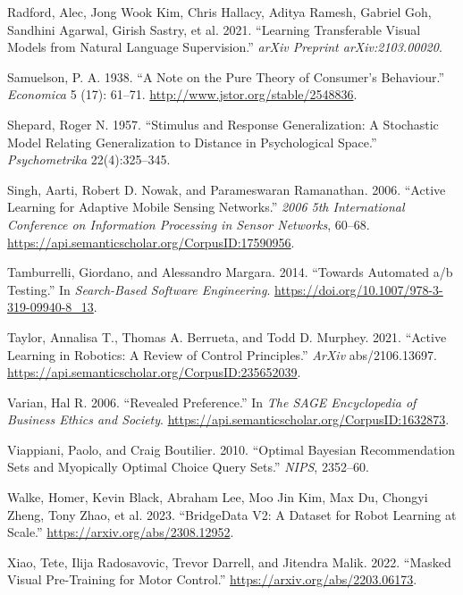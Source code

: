 \documentclass[
  letterpaper,
  numbers=noenddot,
  DIV=11]{scrreprt}
\newlength{\cslhangindent}
\newenvironment{CSLReferences}[2] %
 {\begin{list}{}{%
  \setlength{\itemindent}{0pt}
  \setlength{\leftmargin}{0pt}
  \setlength{\parsep}{0pt}
  \ifodd #1
   \setlength{\leftmargin}{\cslhangindent}
   \setlength{\itemindent}{-1\cslhangindent}
  \fi
  \setlength{\itemsep}{#2\baselineskip}}}
 {\end{list}}
\theoremstyle{definition}
\theoremstyle{plain}
\theoremstyle{plain}
\theoremstyle{remark}
\begin{document}
\begin{CSLReferences}{1}{0}
Radford, Alec, Jong Wook Kim, Chris Hallacy, Aditya Ramesh, Gabriel Goh,
Sandhini Agarwal, Girish Sastry, et al. 2021. {``Learning Transferable
Visual Models from Natural Language Supervision.''} \emph{arXiv Preprint
arXiv:2103.00020}.

Samuelson, P. A. 1938. {``A Note on the Pure Theory of Consumer's
Behaviour.''} \emph{Economica} 5 (17): 61--71.
\url{http://www.jstor.org/stable/2548836}.

Shepard, Roger N. 1957. {``Stimulus and Response Generalization: A
Stochastic Model Relating Generalization to Distance in Psychological
Space.''} \emph{Psychometrika} 22(4):325--345.

Singh, Aarti, Robert D. Nowak, and Parameswaran Ramanathan. 2006.
{``Active Learning for Adaptive Mobile Sensing Networks.''} \emph{2006
5th International Conference on Information Processing in Sensor
Networks}, 60--68.
\url{https://api.semanticscholar.org/CorpusID:17590956}.

Tamburrelli, Giordano, and Alessandro Margara. 2014. {``Towards
Automated a/b Testing.''} In \emph{Search-Based Software Engineering}.
\url{https://doi.org/10.1007/978-3-319-09940-8_13}.

Taylor, Annalisa T., Thomas A. Berrueta, and Todd D. Murphey. 2021.
{``Active Learning in Robotics: A Review of Control Principles.''}
\emph{ArXiv} abs/2106.13697.
\url{https://api.semanticscholar.org/CorpusID:235652039}.

Varian, Hal R. 2006. {``Revealed Preference.''} In \emph{The SAGE
Encyclopedia of Business Ethics and Society}.
\url{https://api.semanticscholar.org/CorpusID:1632873}.

Viappiani, Paolo, and Craig Boutilier. 2010. {``Optimal Bayesian
Recommendation Sets and Myopically Optimal Choice Query Sets.''}
\emph{NIPS}, 2352--60.

Walke, Homer, Kevin Black, Abraham Lee, Moo Jin Kim, Max Du, Chongyi
Zheng, Tony Zhao, et al. 2023. {``BridgeData V2: A Dataset for Robot
Learning at Scale.''} \url{https://arxiv.org/abs/2308.12952}.

Xiao, Tete, Ilija Radosavovic, Trevor Darrell, and Jitendra Malik. 2022.
{``Masked Visual Pre-Training for Motor Control.''}
\url{https://arxiv.org/abs/2203.06173}.


\end{CSLReferences}
\end{document}
